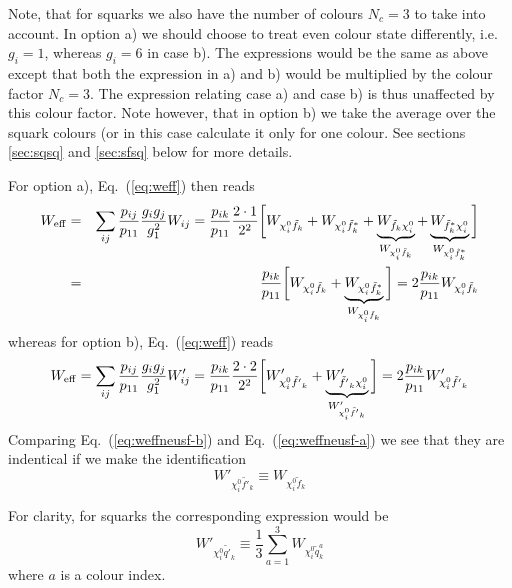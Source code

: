 \documentclass[a4paper,10pt,oneside]{book}
\begin{document}
Note, that for squarks we also have the number of colours $N_c=3$ to take into account.
In option a) we should choose to treat even colour state differently, i.e.\ $g_i=1$, whereas $g_i=6$ in case b). 
The expressions would be the same as above except that both the expression in a) and b) would be multiplied by the colour factor $N_c=3$. The expression relating case a) and case b) is thus unaffected by this colour factor. Note however, that in option b) we take the average over the squark colours (or in this case calculate it only for one colour. See sections \ref{sec:sqsq} and \ref{sec:sfsq} below for more details.

For option a), Eq.~(\ref{eq:weff}) then reads
\begin{eqnarray}
    W_{\rm eff} & = & \sum_{ij}\frac{p_{ij}}{p_{11}} 
    \frac{g_{i}g_{j}}{g_{1}^2} W_{ij}
    =
    \frac{p_{ik}}{p_{11}} \frac{2 \cdot 1}{2^2}
    \bigg[ 
    W_{\chi_{i}^0 \tilde{f}_{k}} +
    W_{\chi_{i}^0 \tilde{f}_{k}^*} +
    \underbrace{W_{\tilde{f}_{k} \chi_{i}^0}}_{W_{\chi_{i}^0 \tilde{f}_{k}}} +
    \underbrace{W_{\tilde{f}_{k}^{*} \chi_{i}^0}}_{W_{\chi_{i}^0 \tilde{f}_{k}^*}}
    \bigg] 
    \nonumber \\
    & = &
    \frac{p_{ik}}{p_{11}}
    \bigg[
    W_{\chi_{i}^0 \tilde{f}_{k}} +
    \underbrace{W_{\chi_{i}^0 \tilde{f}_{k}^*}}_{W_{\chi_{i}^0 \tilde{f}_{k}}}
    \bigg]
    =
    2 \frac{p_{ik}}{p_{11}}
    W_{\chi_{i}^0 \tilde{f}_{k}}
    \label{eq:weffneusf-a}
\end{eqnarray}
whereas for option b), Eq.~(\ref{eq:weff}) reads
\begin{equation}
    W_{\rm eff} = \sum_{ij}\frac{p_{ij}}{p_{11}} 
    \frac{g_{i}g_{j}}{g_{1}^2} W'_{ij}
    =
    \frac{p_{ik}}{p_{11}} \frac{2 \cdot 2}{2^2}
    \bigg[ 
    W'_{\chi_{i}^0 \tilde{f'}_{k}} +
    \underbrace{W'_{\tilde{f'}_{k} \chi_{i}^0}}_{W'_{\chi_{i}^0 \tilde{f'}_{k}}}
    \bigg] 
    =
    2 \frac{p_{ik}}{p_{11}}
    W'_{\chi_{i}^0 \tilde{f'}_{k}}
    \label{eq:weffneusf-b}
\end{equation}
Comparing Eq.~(\ref{eq:weffneusf-b}) and Eq.~(\ref{eq:weffneusf-a}) we 
see that they are indentical if we make the identification
\begin{equation}
    W'_{\chi_{i}^0 \tilde{f'}_{k}} \equiv W_{\chi_{i}^0 \tilde{f}_{k}}
\end{equation}

For clarity, for squarks the corresponding expression would be
\begin{equation}
    W'_{\chi_{i}^0 \tilde{q'}_{k}} \equiv
   \frac{1}{3}\sum_{a=1}^3 W_{\chi_{i}^0 \tilde{q}_{k}^a}
\end{equation}
where $a$ is a colour index.
\end{document}
